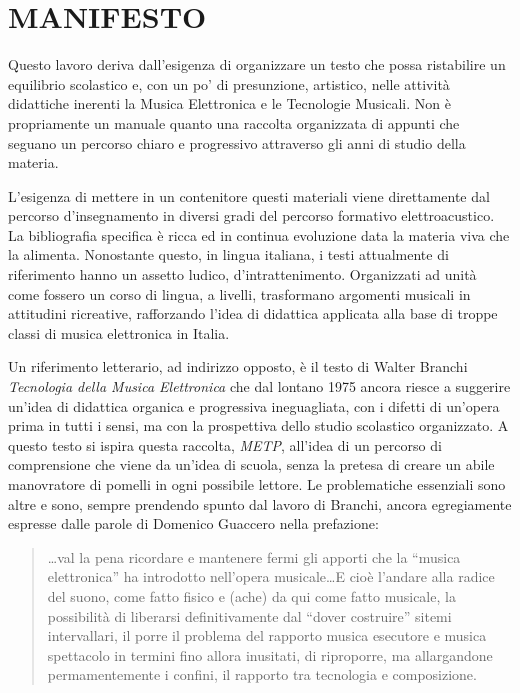 
\chapter*{MANIFESTO}


Questo lavoro deriva dall'esigenza di organizzare un testo che possa
ristabilire un equilibrio scolastico e, con un po' di presunzione, artistico,
nelle attività didattiche inerenti la Musica Elettronica e le Tecnologie
Musicali. Non è propriamente un manuale quanto una raccolta organizzata di
appunti che seguano un percorso chiaro e progressivo attraverso gli anni di
studio della materia.

L'esigenza di mettere in un contenitore questi materiali viene direttamente
dal percorso d'insegnamento in diversi gradi del percorso formativo elettroacustico.
La bibliografia specifica è ricca ed in continua evoluzione data la materia
viva che la alimenta. Nonostante questo, in lingua italiana, i testi attualmente di
riferimento hanno un assetto ludico, d'intrattenimento. Organizzati ad
unità come fossero un corso di lingua, a livelli, trasformano argomenti musicali
in attitudini ricreative, rafforzando l'idea di didattica applicata alla base
di troppe classi di musica elettronica in Italia.

Un riferimento letterario, ad indirizzo opposto, è il testo di Walter Branchi
\emph{Tecnologia della Musica Elettronica} che dal lontano 1975 ancora riesce
a suggerire un'idea di didattica organica e progressiva ineguagliata, con i
difetti di un'opera prima in tutti i sensi, ma con la prospettiva dello studio
scolastico organizzato. A questo testo si ispira questa raccolta, \emph{METP},
all'idea di un percorso di comprensione che viene da un'idea di scuola,
senza la pretesa di creare un abile manovratore di pomelli in ogni possibile lettore.
Le problematiche essenziali sono altre e sono, sempre prendendo spunto dal lavoro di Branchi,
ancora egregiamente espresse dalle parole di Domenico Guaccero nella prefazione:

\begin{quote}
  \ldots val la pena ricordare e mantenere fermi gli apporti che la “musica
  elettronica” ha introdotto nell'opera musicale\ldots E cioè l'andare alla
  radice del suono, come fatto fisico e (ache) da qui come fatto musicale, la
  possibilità di liberarsi definitivamente dal “dover costruire” sitemi
  intervallari, il porre il problema del rapporto musica esecutore e musica
  spettacolo in termini fino allora inusitati, di riproporre, ma allargandone
  permamentemente i confini, il rapporto tra tecnologia e composizione.
\end{quote}

